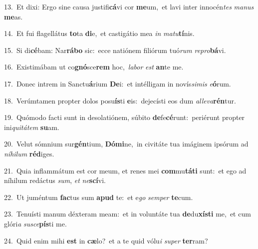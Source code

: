 {\numbfont\textcolor{\numbcolor}{13.}}~Et dixi: Ergo sine causa justifi\-\textbf{cá}\-vi cor \textbf{me}\-um,~\star et lavi inter innocén\textit{tes} \textit{ma}\-\textit{nus} \textbf{me}\-as.\par
{\numbfont\textcolor{\numbcolor}{14.}}~Et fui flagellátus \textbf{to}\-ta \textbf{di}\-e,~\star et castigátio mea \textit{in} \textit{ma}\-\textit{tu}\textbf{tí}nis.\par
{\numbfont\textcolor{\numbcolor}{15.}}~Si di\-\textbf{cé}\-bam: Nar\-\textbf{rá}\-\textbf{bo} sic:~\star ecce natiónem filiórum tuó\textit{rum} \textit{re}\-\textit{pro}\textbf{bá}vi.\par
{\numbfont\textcolor{\numbcolor}{16.}}~Existimábam ut co\-\textbf{gnó}\-sce\textbf{rem} hoc,~\star \textit{la}\-\textit{bor} \textit{est} \textbf{an}\-te me.\par
{\numbfont\textcolor{\numbcolor}{17.}}~Donec intrem in Sanctu\-\textbf{á}\-rium \textbf{De}\-i:~\star et intélligam in novís\-\textit{si}\-\textit{mis} \textit{e}\-\textbf{ó}rum.\par
{\numbfont\textcolor{\numbcolor}{18.}}~Verúmtamen propter dolos posu\-\textbf{ís}\-ti \textbf{e}\-is:~\star dejecísti eos dum \textit{al}\-\textit{le}\textit{va}\textbf{rén}tur.\par
{\numbfont\textcolor{\numbcolor}{19.}}~Quómodo facti sunt in desolatiónem, súbito \textbf{de}\-fe\-\textbf{cé}\-runt:~\star periérunt propter ini\-\textit{qui}\-\textit{tá}\textit{tem} \textbf{su}\-am.\par
{\numbfont\textcolor{\numbcolor}{20.}}~Velut sómnium sur\-\textbf{gén}\-tium, \textbf{Dó}\-\textbf{mi}ne,~\star in civitáte tua imáginem ipsórum ad \textit{ní}\-\textit{hi}\textit{lum} \textbf{réd}\-iges.\par
{\numbfont\textcolor{\numbcolor}{21.}}~Quia inflammátum est cor meum, et renes mei \textbf{com}\-mu\-\textbf{tá}\-\textbf{ti} sunt:~\star et ego ad níhilum redáctus \textit{sum}\-, \textit{et} \textit{ne}\-\textbf{scí}vi.\par
{\numbfont\textcolor{\numbcolor}{22.}}~Ut juméntum \textbf{fac}\-tus sum \textbf{a}\-\textbf{pud} te:~\star et e\textit{go} \textit{sem}\-\textit{per} \textbf{te}\-cum.\par
{\numbfont\textcolor{\numbcolor}{23.}}~Tenuísti manum déxteram meam:~\dagger et in voluntáte tua \textbf{de}\-du\-\textbf{xís}\-\textbf{ti} me,~\star et cum glóri\textit{a} \textit{su}\-\textit{sce}\textbf{pís}ti me.\par
{\numbfont\textcolor{\numbcolor}{24.}}~Quid enim mihi \textbf{est} in \textbf{cæ}\-lo?~\star et a te quid vólu\textit{i} \textit{su}\-\textit{per} \textbf{ter}\-ram?\par
